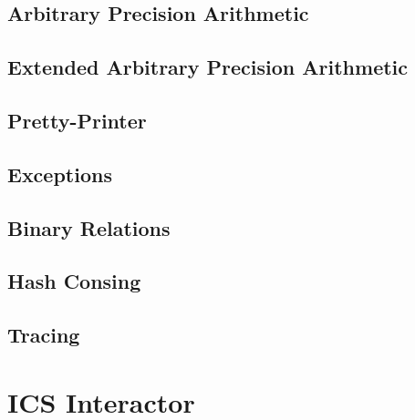 \documentclass[12pt]{article}
\begin{document}
  
  

  \subsection{Arbitrary Precision Arithmetic}\label{sec:apa}
   
   

  \subsection{Extended Arbitrary Precision Arithmetic}\label{sec:apa}
   
   

  \subsection{Pretty-Printer}\label{subsec:pretty}
  
  

  \subsection{Exceptions}\label{subsec:exceptions}

   
   

  \subsection{Binary Relations}\label{subsec:binrel}

   
   

  \subsection{Hash Consing}\label{subsec:hashcons}

  
  
 
  \subsection{Tracing}\label{subsec:trace}

   
   

\section{ICS Interactor}\label{sec:interpreter}
  
\end{document}
